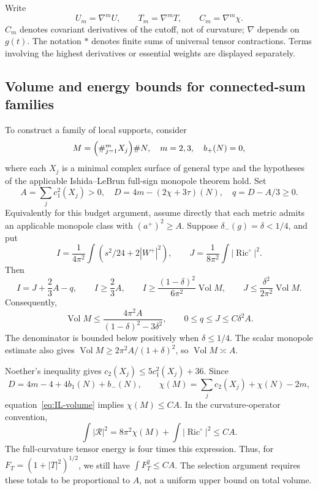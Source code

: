 \documentclass[a4paper,11pt]{article}
\numberwithin{equation}{section}
\theoremstyle{definition}
\newcommand{\Ric}{\operatorname{Ric}}
\newcommand{\Vol}{\operatorname{Vol}}
\begin{document}
Write
\[
U_m=\nabla^mU,\qquad T_m=\nabla^mT,\qquad C_m=\nabla^m\chi.
\]
$C_m$ denotes covariant derivatives of the cutoff, not of curvature; $\nabla$ depends on $g(t)$. The notation $*$ denotes finite sums of universal tensor contractions. Terms involving the highest derivatives or essential weights are displayed separately.

\subsection{Volume and energy bounds for connected-sum families}
To construct a family of local supports, consider
\[
M=\Bigl(\#_{j=1}^{m}X_j\Bigr)\#N,\quad m=2,3,\quad b_+(N)=0,
\]
where each $X_j$ is a minimal complex surface of general type and the hypotheses of the applicable Ishida--LeBrun full-sign monopole theorem hold. Set
\[
A=\sum_jc_1^2(X_j)>0,\quad
D=4m-(2\chi+3\tau)(N),\quad q=D-A/3\ge0.
\]
Equivalently for this budget argument, assume directly that each metric admits an applicable monopole class with $(a^+)^2\ge A$. Suppose $\delta_-(g)=\delta<1/4$, and put
\[
I=\frac1{4\pi^2}\int(s^2/24+2|W^+|^2),\qquad
J=\frac1{8\pi^2}\int|\Ric^\circ|^2.
\]
Then
\[
I=J+\frac23A-q,\qquad I\ge\frac23A,\qquad
I\ge\frac{(1-\delta)^2}{6\pi^2}\Vol M,\qquad
J\le\frac{\delta^2}{2\pi^2}\Vol M.
\]
Consequently,
\begin{equation}\label{eq:IL-volume}
\Vol M\le\frac{4\pi^2A}{(1-\delta)^2-3\delta^2},
\qquad 0\le q\le J\le C\delta^2A.
\end{equation}
The denominator is bounded below positively when $\delta\le1/4$. The scalar monopole estimate also gives $\Vol M\ge2\pi^2A/(1+\delta)^2$, so $\Vol M\asymp A$.

Noether's inequality gives $c_2(X_j)\le5c_1^2(X_j)+36$. Since
\[
D=4m-4+4b_1(N)+b_-(N),\qquad
\chi(M)=\sum_jc_2(X_j)+\chi(N)-2m,
\]
equation~\eqref{eq:IL-volume} implies $\chi(M)\le CA$. In the curvature-operator convention,
\[
\int|\mathcal R|^2=8\pi^2\chi(M)+\int|\Ric^\circ|^2\le CA.
\]
The full-curvature tensor energy is four times this expression. Thus, for
$F_T=(1+|T|^2)^{1/2}$, we still have $\int F_T^2\le CA$. The selection argument requires these totals to be proportional to $A$, not a uniform upper bound on total volume.
\end{document}

